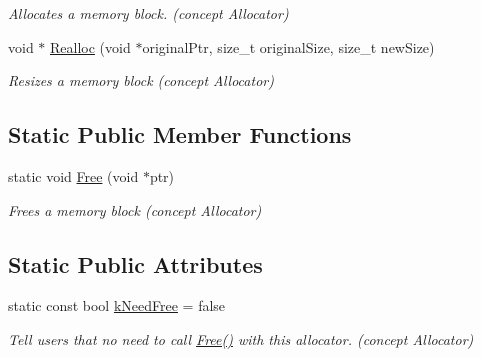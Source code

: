 \begin{DoxyCompactItemize}
\begin{DoxyCompactList}\small\item\em Allocates a memory block. (concept Allocator) \end{DoxyCompactList}\item 
void $\ast$ \hyperlink{classMemoryPoolAllocator_aba75280d42184b0ad414243f7f5ac6c7}{Realloc} (void $\ast$original\+Ptr, size\+\_\+t original\+Size, size\+\_\+t new\+Size)\hypertarget{classMemoryPoolAllocator_aba75280d42184b0ad414243f7f5ac6c7}{}\label{classMemoryPoolAllocator_aba75280d42184b0ad414243f7f5ac6c7}

\begin{DoxyCompactList}\small\item\em Resizes a memory block (concept Allocator) \end{DoxyCompactList}\end{DoxyCompactItemize}
\subsection*{Static Public Member Functions}
\begin{DoxyCompactItemize}
\item 
static void \hyperlink{classMemoryPoolAllocator_a6b180eb150451b4df8b70d827cd1191c}{Free} (void $\ast$ptr)\hypertarget{classMemoryPoolAllocator_a6b180eb150451b4df8b70d827cd1191c}{}\label{classMemoryPoolAllocator_a6b180eb150451b4df8b70d827cd1191c}

\begin{DoxyCompactList}\small\item\em Frees a memory block (concept Allocator) \end{DoxyCompactList}\end{DoxyCompactItemize}
\subsection*{Static Public Attributes}
\begin{DoxyCompactItemize}
\item 
static const bool \hyperlink{classMemoryPoolAllocator_ab4c7c5c631e451689bc9da392a65194f}{k\+Need\+Free} = false\hypertarget{classMemoryPoolAllocator_ab4c7c5c631e451689bc9da392a65194f}{}\label{classMemoryPoolAllocator_ab4c7c5c631e451689bc9da392a65194f}

\begin{DoxyCompactList}\small\item\em Tell users that no need to call \hyperlink{classMemoryPoolAllocator_a6b180eb150451b4df8b70d827cd1191c}{Free()} with this allocator. (concept Allocator) \end{DoxyCompactList}\end{DoxyCompactItemize}


